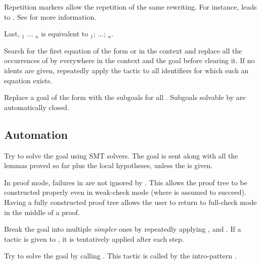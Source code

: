   \medskip
  
  Repetition markers allow the repetition of the same rewriting. For instance,
  \tacname{}  leads to  \tacname{} . See  for
  more information.
  
  \medskip

  Last, \tacname{} ${}_1$ ... ${}_n$ is equivalent to
  \tacname{} ${}_1$; ...; \tacname{} ${}_n$.
  
Search for the first equation of the form  or  in the context
 and replace all the occurrences of  by  everywhere in the context and the
 goal before clearing it. If no idents are given, repeatedly apply the tactic to
 all identifiers for which such an equation exists.


Replace a goal of the form  with the subgoals
 for all . Subgoals solvable by  are
automatically closed.


\subsection{Automation}

Try to solve the goal using SMT solvers. The goal is sent along with all the
lemmas proved so far plus the local hypotheses, unless the  is
given.
 

In  proof mode, failures in  are not ignored by .
This allows the proof tree to be constructed properly even in weak-check mode
(where  is assumed to succeed). Having a fully constructed proof tree
allows the user to return to full-check mode in the middle of a proof.

Break the goal into multiple \emph{simpler} ones by repeatedly applying
,  and . If a tactic is given to \tacname{},
it is tentatively applied after each step.


Try to solve the goal by calling .
This tactic is called by the intro-pattern \ec{//}.
